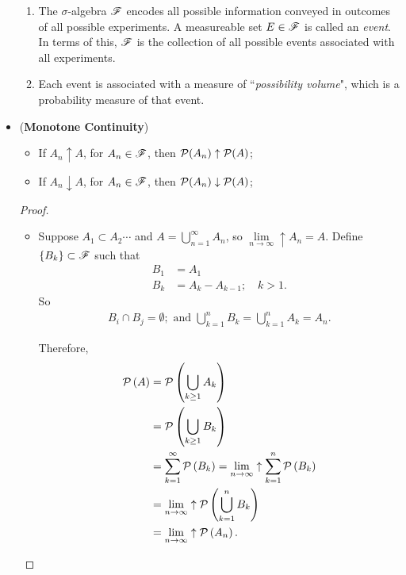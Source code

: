 \documentclass[11pt]{article}
\begin{document}
\begin{itemize}
\begin{remark}
\begin{enumerate}
\item The $\sigma$-algebra ${\mathscr F}$ encodes all possible information conveyed in outcomes of all possible experiments. A measureable set $E\in {\mathscr F}$ is called an \emph{event}. In terms of this, ${\mathscr F}$ is the collection of all possible events associated with all experiments.

\item Each event is associated with a measure of ``\emph{possibility volume}", which is a probability measure of that event. 
\end{enumerate}
\end{remark}

\item \begin{proposition}(\textbf{Monotone Continuity}) \citep{resnick2013probability, billingsley2008probability}
 \begin{itemize}
 \item If $A_{n}\uparrow A$, for $A_{n}\in {\mathscr F}$, then ${\mathcal P}(A_{n})\uparrow {\mathcal P}(A)$;
 \item If $A_{n}\downarrow A$, for $A_{n}\in {\mathscr F}$, then ${\mathcal P}(A_{n})\downarrow {\mathcal P}(A)$;
 \end{itemize}
\end{proposition}
\begin{proof}
\begin{itemize}
\item Suppose $A_{1}\subset A_{2} \cdots$ and $A = \bigcup_{n=1}^{\infty}A_{n}$, so $\lim\limits_{n\rightarrow\infty}\uparrow A_{n} = A$. Define $\left\{B_{k}\right\} \subset {\mathscr F}$ such that 
\begin{align*}
B_{1}&= A_{1}\\
B_{k}& = A_{k}- A_{k-1};\quad k> 1.
\end{align*}
So 
\begin{align*}
B_{i}\cap B_{j} = \emptyset; \text{ and }  \bigcup_{k= 1}^{n}B_{k} = \bigcup_{k= 1}^{n}A_{k}= A_{n}.
\end{align*}

Therefore,
\begin{align*}
{\mathcal P}\left(A\right) &= {\mathcal P}\left(\bigcup_{k\ge 1}A_{k}\right)\\
&= {\mathcal P}\left(\bigcup_{k\ge 1}B_{k} \right)\\
&= \sum_{k=1}^{\infty}{\mathcal P}\left(B_{k}\right)=\lim\limits_{n\rightarrow \infty}\uparrow\sum_{k=1}^{n}{\mathcal P}\left(B_{k}\right)\\
&= \lim\limits_{n\rightarrow \infty}\uparrow{\mathcal P}\left(\bigcup_{k=1}^{n}B_{k}\right)\\
&= \lim\limits_{n\rightarrow \infty}\uparrow{\mathcal P}\left(A_{n}\right).
\end{align*}


\end{itemize}
\end{proof}
\end{itemize}
\end{document}
